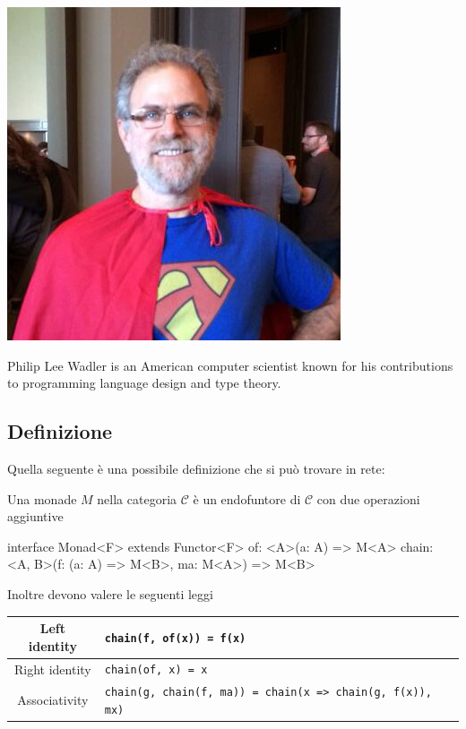 \documentclass[12pt]{article}
\theoremstyle{definition}
\newenvironment{code}
  {\vspace{0.5cm} \VerbatimEnvironment\begin{typescriptcode}}
  {\end{typescriptcode} \vspace{0.2cm}}
\begin{document}
\begin{center}
\includegraphics[scale=0.45]{wadler}
\end{center}

Philip Lee Wadler is an American computer scientist known for his contributions to programming language design and type theory.

\subsection{Definizione}

Quella seguente è una possibile definizione che si può trovare in rete:

Una monade $M$ nella categoria $\mathcal{C}$ è un endofuntore di $\mathcal{C}$ con due operazioni aggiuntive

\begin{code}
interface Monad<F> extends Functor<F> {
  of: <A>(a: A) => M<A>
  chain: <A, B>(f: (a: A) => M<B>, ma: M<A>) => M<B>
}
\end{code}

Inoltre devono valere le seguenti leggi

\begin{center}
\bgroup
\def\arraystretch{1.5}
\begin{tabular}{ |c|p{10cm}| }
\hline
Left identity & \texttt{chain(f, of(x)) = f(x)} \\
\hline
Right identity & \texttt{chain(of, x) = x} \\
\hline
Associativity & \texttt{chain(g, chain(f, ma)) = chain(x => chain(g, f(x)), mx)} \\
\hline
\end{tabular}
\egroup
\end{center}
\end{document}
